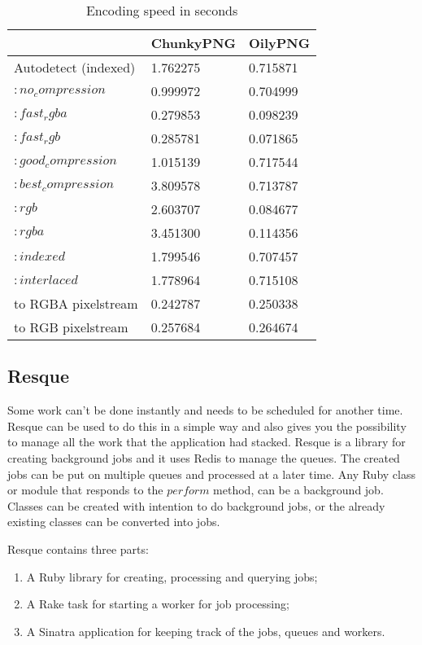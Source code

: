 \begin{table}[ht!]
\centering
\caption{Encoding speed in seconds}
{
\renewcommand{\arraystretch}{1.25}
\begin{tabular}{ lll }
                        & ChunkyPNG   &   OilyPNG \\ \hline
Autodetect (indexed)    & 1.762275    & 0.715871 \\
$:no_compression$       & 0.999972    & 0.704999 \\
$:fast_rgba$            & 0.279853    & 0.098239 \\
$:fast_rgb$             & 0.285781    & 0.071865 \\
$:good_compression$     & 1.015139    & 0.717544 \\
$:best_compression$     & 3.809578    & 0.713787 \\
$:rgb$                  & 2.603707    & 0.084677 \\
$:rgba$                 & 3.451300    & 0.114356 \\
$:indexed$              & 1.799546    & 0.707457 \\
$:interlaced$           & 1.778964    & 0.715108 \\
to RGBA pixelstream     & 0.242787    & 0.250338 \\
to RGB pixelstream      & 0.257684    & 0.264674 \\
\end{tabular}
}
\label{encoding_speed}
\end{table}



\subsection{Resque}
Some work can't be done instantly and needs to be scheduled for another time. Resque can be used to do this in a simple way and also gives you the possibility to manage all the work that the application had stacked.
Resque is a library for creating background jobs and it uses Redis to manage the queues. The created jobs can be put on multiple queues and processed at a later time.
Any Ruby class or module that responds to the $perform$ method, can be a background job. Classes can be created with intention to do background jobs, or the already existing classes can be converted into jobs.

Resque contains three parts:

\begin{enumerate}
  \item A Ruby library for creating, processing and querying jobs;
  \item A Rake task for starting a worker for job processing;
  \item A Sinatra application for keeping track of the jobs, queues and workers.
\end{enumerate}

